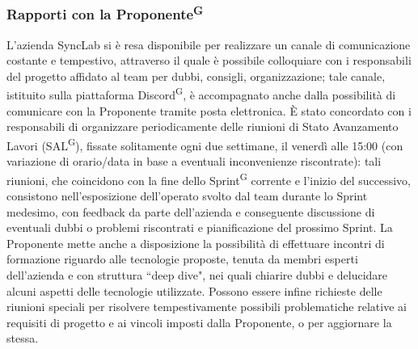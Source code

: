 \documentclass[8pt]{article}
\newcommand{\glossterm}[1]{#1\textsuperscript{G}} %
\begin{document}
\subsubsection{Rapporti con la \glossterm{Proponente}}
L'azienda SyncLab si è resa disponibile per realizzare un canale di comunicazione costante e
tempestivo, attraverso il quale è possibile colloquiare con i responsabili del progetto affidato al
team per dubbi, consigli, organizzazione; tale canale, istituito sulla piattaforma
\glossterm{Discord}, è accompagnato anche dalla possibilità di comunicare con la Proponente tramite
posta elettronica. È stato concordato con i responsabili di organizzare periodicamente delle
riunioni di Stato Avanzamento Lavori (\glossterm{SAL}), fissate solitamente ogni due settimane, il
venerdì alle 15:00 (con variazione di orario/data in base a eventuali inconvenienze riscontrate):
tali riunioni, che coincidono con la fine dello \glossterm{Sprint} corrente e l'inizio del
successivo, consistono nell'esposizione dell'operato svolto dal team durante lo Sprint medesimo, con
feedback da parte dell'azienda e conseguente discussione di eventuali dubbi o problemi
riscontrati e pianificazione del prossimo Sprint.
La Proponente mette anche a disposizione la possibilità di effettuare incontri di formazione
riguardo alle tecnologie proposte, tenuta da membri esperti dell'azienda e con struttura ``deep
dive", nei quali chiarire dubbi e delucidare alcuni aspetti delle tecnologie utilizzate. 
Possono essere infine richieste delle riunioni speciali per risolvere tempestivamente possibili
problematiche relative ai requisiti di progetto e ai vincoli imposti dalla Proponente, o per
aggiornare la stessa.
\clearpage
\end{document}
